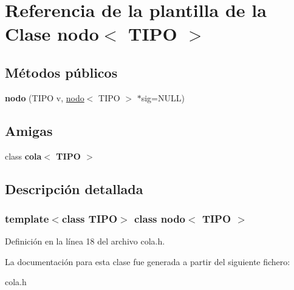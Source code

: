 \hypertarget{classnodo}{}\section{Referencia de la plantilla de la Clase nodo$<$ T\+I\+PO $>$}
\label{classnodo}
\subsection*{Métodos públicos}
\begin{DoxyCompactItemize}
\item 
\mbox{\label{classnodo_ad6c42379673cc2de946e77dacace5155}} 
{\bfseries nodo} (T\+I\+PO v, \hyperlink{classnodo}{nodo}$<$ T\+I\+PO $>$ $\ast$sig=N\+U\+LL)
\end{DoxyCompactItemize}
\subsection*{Amigas}
\begin{DoxyCompactItemize}
\item 
\mbox{\label{classnodo_ab6f31a6b425c314a481175b5254170ab}} 
class {\bfseries cola$<$ T\+I\+P\+O $>$}
\end{DoxyCompactItemize}


\subsection{Descripción detallada}
\subsubsection*{template$<$class T\+I\+PO$>$\newline
class nodo$<$ T\+I\+P\+O $>$}



Definición en la línea 18 del archivo cola.\+h.



La documentación para esta clase fue generada a partir del siguiente fichero\+:\begin{DoxyCompactItemize}
\item 
cola.\+h\end{DoxyCompactItemize}
